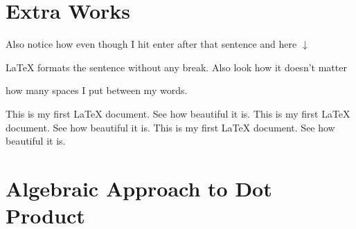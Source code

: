 \section{Extra Works}
Also notice how even though I hit enter after that sentence and here $\downarrow$ 

\LaTeX{} formats the sentence without any break.  
Also   look  how      it   doesn't     matter      


    how    many  spaces     I put     between  
	     my    words.




This is my first LaTeX document. See how beautiful it is. 
This is my first LaTeX document. See how beautiful it is.
This is my first LaTeX document. See how beautiful it is.
\section{Algebraic Approach to Dot Product}
